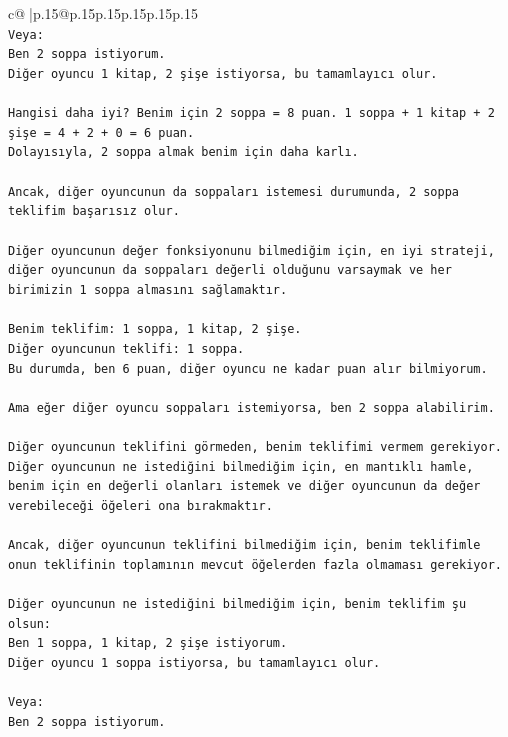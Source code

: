 \documentclass{article}
\begin{document}
{\begin{supertabular}{c@{$\;$}|p{.15\linewidth}@{}p{.15\linewidth}p{.15\linewidth}p{.15\linewidth}p{.15\linewidth}p{.15\linewidth}}
{{{\\ 
\texttt{Veya:} \\
\texttt{Ben 2 soppa istiyorum.} \\
\texttt{Diğer oyuncu 1 kitap, 2 şişe istiyorsa, bu tamamlayıcı olur.} \\
\\ 
\texttt{Hangisi daha iyi? Benim için 2 soppa = 8 puan. 1 soppa + 1 kitap + 2 şişe = 4 + 2 + 0 = 6 puan.} \\
\texttt{Dolayısıyla, 2 soppa almak benim için daha karlı.} \\
\\ 
\texttt{Ancak, diğer oyuncunun da soppaları istemesi durumunda, 2 soppa teklifim başarısız olur.} \\
\\ 
\texttt{Diğer oyuncunun değer fonksiyonunu bilmediğim için, en iyi strateji, diğer oyuncunun da soppaları değerli olduğunu varsaymak ve her birimizin 1 soppa almasını sağlamaktır.} \\
\\ 
\texttt{Benim teklifim: 1 soppa, 1 kitap, 2 şişe.} \\
\texttt{Diğer oyuncunun teklifi: 1 soppa.} \\
\texttt{Bu durumda, ben 6 puan, diğer oyuncu ne kadar puan alır bilmiyorum.} \\
\\ 
\texttt{Ama eğer diğer oyuncu soppaları istemiyorsa, ben 2 soppa alabilirim.} \\
\\ 
\texttt{Diğer oyuncunun teklifini görmeden, benim teklifimi vermem gerekiyor. Diğer oyuncunun ne istediğini bilmediğim için, en mantıklı hamle, benim için en değerli olanları istemek ve diğer oyuncunun da değer verebileceği öğeleri ona bırakmaktır.} \\
\\ 
\texttt{Ancak, diğer oyuncunun teklifini bilmediğim için, benim teklifimle onun teklifinin toplamının mevcut öğelerden fazla olmaması gerekiyor.} \\
\\ 
\texttt{Diğer oyuncunun ne istediğini bilmediğim için, benim teklifim şu olsun:} \\
\texttt{Ben 1 soppa, 1 kitap, 2 şişe istiyorum.} \\
\texttt{Diğer oyuncu 1 soppa istiyorsa, bu tamamlayıcı olur.} \\
\\ 
\texttt{Veya:} \\
\texttt{Ben 2 soppa istiyorum.} \\
}}}
\end{supertabular}}
\end{document}
